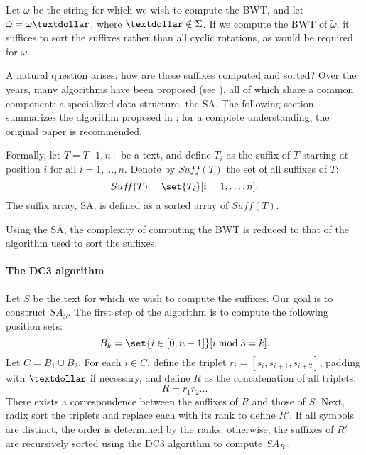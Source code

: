 \documentclass{subfiles}
\begin{document}
    Let \(\omega\) be the string for which we wish to compute the BWT, and 
        let \(\tilde{\omega} = \omega\textdollar\), where 
        \(\textdollar \notin \Sigma\). If we compute the BWT of 
        \(\tilde{\omega}\), it suffices to sort the suffixes rather than all cyclic 
        rotations, as would be required for \(\omega\).

    A natural question arises: how are these suffixes computed and sorted? 
        Over the years, many algorithms have been proposed 
        (see \cite{karkkainen2006, ko2005, baier2016}), all of which share a 
        common component: a specialized data structure, the SA. The following 
        section summarizes the algorithm proposed in \cite{karkkainen2006}; 
        for a complete understanding, the original paper is recommended.

    Formally, let \(T = T[1, n]\) be a text, and define \(T_{i}\) as the 
        suffix of \(T\) starting at position \(i\) for all \(i = 1, \ldots, n\). 
        Denote by \(Suf\!f(T)\) the set of all suffixes of \(T\):
        \[
            Suf\!f(T) = \set{T_{i}}[i = 1, \ldots, n].
        \]
        The suffix array, SA, is defined as a sorted array of \(Suf\!f(T)\).

        \begin{remark*}
            Using the SA, the complexity of computing the BWT is reduced to that 
            of the algorithm used to sort the suffixes.
        \end{remark*}

    \paragraph{The DC3 algorithm}
    Let \(S\) be the text for which we wish to compute the suffixes. Our 
        goal is to construct \(SA_{S}\). The first step of the algorithm is to 
        compute the following position sets:
        \[
            B_{k} = \set{i \in [0, n - 1]}[i \bmod 3 = k].
        \]
        Let \(C = B_{1} \cup B_{2}\). For each \(i \in C\), define the triplet 
        \(r_i = [s_{i}, s_{i + 1}, s_{i + 2}]\), padding with \(\textdollar\) 
        if necessary, and define \(R\) as the concatenation of all triplets:
        \[
            R = r_{1} r_{2} \ldots
        \]
        There exists a correspondence between the suffixes of \(R\) and those of \(S\). 
        Next, radix sort the triplets and replace each with its rank to define \(R'\). 
        If all symbols are distinct, the order is determined by the ranks; otherwise, 
        the suffixes of \(R'\) are recursively sorted using the DC3 algorithm to 
        compute \(SA_{R'}\).
\end{document}
